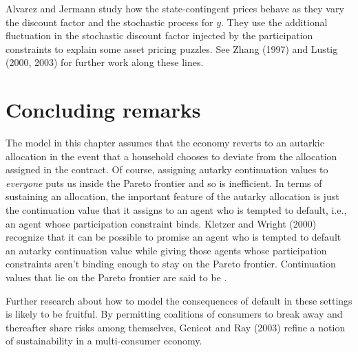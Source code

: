 Alvarez and Jermann study how the state-contingent prices
 behave as they vary the discount factor and the
stochastic process for $y$.  They use the additional fluctuation
in the stochastic discount factor injected by the participation
constraints to explain some asset pricing puzzles.  See Zhang
(1997) and Lustig (2000, 2003) for further work along these lines.
 

\section{Concluding remarks}

   The model in this chapter assumes that the economy
   reverts to an autarkic allocation in the event that a household
chooses to deviate from the allocation assigned in the contract.
Of course, assigning  autarky continuation values to {\it
everyone\/} puts us inside the Pareto frontier and so is
inefficient. In terms of sustaining an allocation, the important
feature of  the autarky allocation  is just the continuation value
that it assigns to an agent who is tempted to default, i.e., an
agent whose participation constraint binds. Kletzer and Wright
(2000) recognize that it can be possible to promise an agent who
is tempted to default an autarky continuation value while giving
those agents whose participation constraints aren't binding enough
to stay on the Pareto frontier. Continuation values that lie on
the Pareto frontier are said to be .

Further research about how to model the consequences of default in
these settings is likely to be fruitful. By  permitting coalitions
of consumers to break away and thereafter share risks among
themselves, Genicot and Ray (2003)  refine a notion of
sustainability in
 a  multi-consumer economy.

 
 \showchaptIDfalse \showsectIDfalse
